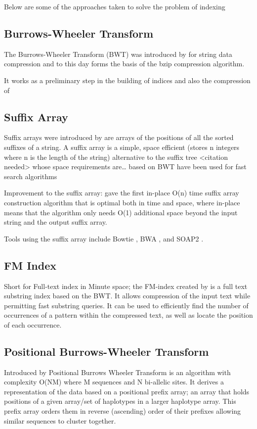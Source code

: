 \documentclass[11pt]{article}
\begin{document}
Below are some of the approaches taken to solve the problem of indexing
\subsection{Burrows-Wheeler Transform}
\label{sec:org2e1aa8c}
The Burrows-Wheeler Transform (BWT) was introduced by
\cite{burrowsBlocksortingLosslessData1994} for string data 
compression and to this day forms the basis of the bzip compression algorithm.

It works as a preliminary step in the building of indices and also the 
compression of 


\subsection{Suffix Array}
\label{sec:orgf9facc7}
Suffix arrays were introduced by \cite{manberSuffixArraysNew1990} are arrays of
the positions of all the sorted suffixes of a string. 
A suffix array is a simple, space efficient 
(stores n integers where n is the length of the string) alternative to the
suffix tree <citation needed> whose space requirements are\ldots{}
based on BWT have been used for fast search algorithms

Improvement to the suffix array: \cite{liMinimapMiniasmFast2016}
gave the first in-place O(n) time suffix array construction algorithm that is 
optimal both in time and space, where in-place means that the algorithm only
needs O(1) additional space beyond the input string and the output suffix
array.

Tools using the suffix array include Bowtie
\cite{langmeadUltrafastMemoryefficientAlignment2009}, BWA
\cite{liFastAccurateShort2009}, 
and SOAP2 \cite{liSOAP2ImprovedUltrafast2009}.

\subsection{FM Index}
\label{sec:org886eca9}
Short for Full-text index in Minute space; the FM-index created
by \cite{ferraginaOpportunisticDataStructures2000} is a full text substring index
based on the BWT. It allows compression of the input text while permitting fast
substring queries. It can be used to efficiently find the number of occurrences
of a pattern within the compressed text, as well as locate the position of each
occurrence.

\subsection{Positional Burrows-Wheeler Transform}
\label{sec:org43011ae}
Introduced by \cite{durbinEfficientHaplotypeMatching2014} Positional Burrows 
Wheeler Transform is an algorithm with complexity O(NM) where M sequences and
N bi-allelic sites.
It derives a representation of the data based on a positional prefix array; an
array that holds positions of a given array/set of haplotypes in a larger 
haplotype array. This prefix array orders them in reverse (ascending) order of
their prefixes allowing similar sequences to cluster together.
\end{document}
